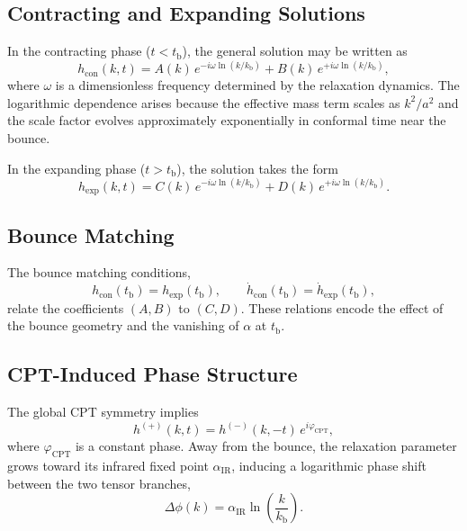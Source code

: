 \documentclass[11pt,a4paper]{article}
\begin{document}
\subsection{Contracting and Expanding Solutions}

In the contracting phase ($t < t_{\mathrm{b}}$), the general solution may be written as
\begin{equation}
    h_{\mathrm{con}}(k,t)
    = A(k)\, e^{-i\omega \ln(k/k_{\mathrm{b}})}
    + B(k)\, e^{+i\omega \ln(k/k_{\mathrm{b}})},
\end{equation}
where $\omega$ is a dimensionless frequency determined by the relaxation dynamics.
The logarithmic dependence arises because the effective mass term scales as
$k^{2}/a^{2}$ and the scale factor evolves approximately exponentially in conformal
time near the bounce.

In the expanding phase ($t > t_{\mathrm{b}}$), the solution takes the form
\begin{equation}
    h_{\mathrm{exp}}(k,t)
    = C(k)\, e^{-i\omega \ln(k/k_{\mathrm{b}})}
    + D(k)\, e^{+i\omega \ln(k/k_{\mathrm{b}})}.
\end{equation}

\subsection{Bounce Matching}

The bounce matching conditions,
\begin{equation}
    h_{\mathrm{con}}(t_{\mathrm{b}}) = h_{\mathrm{exp}}(t_{\mathrm{b}}),
    \qquad
    \dot{h}_{\mathrm{con}}(t_{\mathrm{b}}) = \dot{h}_{\mathrm{exp}}(t_{\mathrm{b}}),
\end{equation}
relate the coefficients $(A,B)$ to $(C,D)$. These relations encode the effect of the
bounce geometry and the vanishing of $\alpha$ at $t_{\mathrm{b}}$.

\subsection{CPT-Induced Phase Structure}

The global CPT symmetry implies
\begin{equation}
    h^{(+)}(k,t)
    = h^{(-)}(k,-t)\, e^{i\varphi_{\mathrm{CPT}}},
\end{equation}
where $\varphi_{\mathrm{CPT}}$ is a constant phase. Away from the bounce, the relaxation
parameter grows toward its infrared fixed point $\alpha_{\mathrm{IR}}$, inducing a logarithmic
phase shift between the two tensor branches,
\begin{equation}
    \Delta\phi(k)
    = \alpha_{\mathrm{IR}} \ln\!\left( \frac{k}{k_{\mathrm{b}}} \right).
\end{equation}
\end{document}
